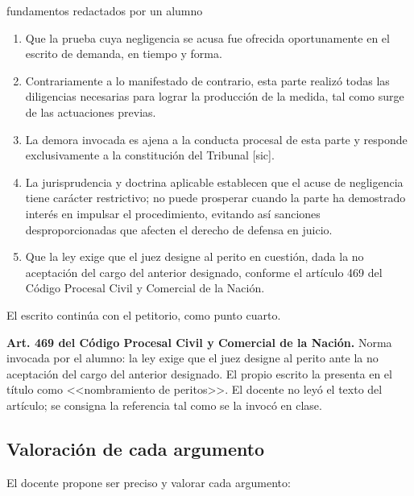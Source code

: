 \documentclass[12pt,oneside]{book}
\begin{document}
\begin{example}{fundamentos redactados por un alumno}
\begin{enumerate}
    \item Que la prueba cuya negligencia se acusa fue ofrecida oportunamente en el escrito de demanda, en tiempo y forma.
    \item Contrariamente a lo manifestado de contrario, esta parte realizó todas las diligencias necesarias para lograr la producción de la medida, tal como surge de las actuaciones previas.
    \item La demora invocada es ajena a la conducta procesal de esta parte y responde exclusivamente a la constitución del Tribunal [sic].
    \item La jurisprudencia y doctrina aplicable establecen que el acuse de negligencia tiene carácter restrictivo; no puede prosperar cuando la parte ha demostrado interés en impulsar el procedimiento, evitando así sanciones desproporcionadas que afecten el derecho de defensa en juicio.
    \item Que la ley exige que el juez designe al perito en cuestión, dada la no aceptación del cargo del anterior designado, conforme el artículo 469 del Código Procesal Civil y Comercial de la Nación.
\end{enumerate}
El escrito continúa con el petitorio, como punto cuarto.
\end{example}

\begin{note}
\textbf{Art. 469 del Código Procesal Civil y Comercial de la Nación.} Norma invocada por el alumno: la ley exige que el juez designe al perito ante la no aceptación del cargo del anterior designado. El propio escrito la presenta en el título como <<nombramiento de peritos>>. El docente no leyó el texto del artículo; se consigna la referencia tal como se la invocó en clase.
\end{note}

\subsection{Valoración de cada argumento}

El docente propone ser preciso y valorar cada argumento:
\end{document}

